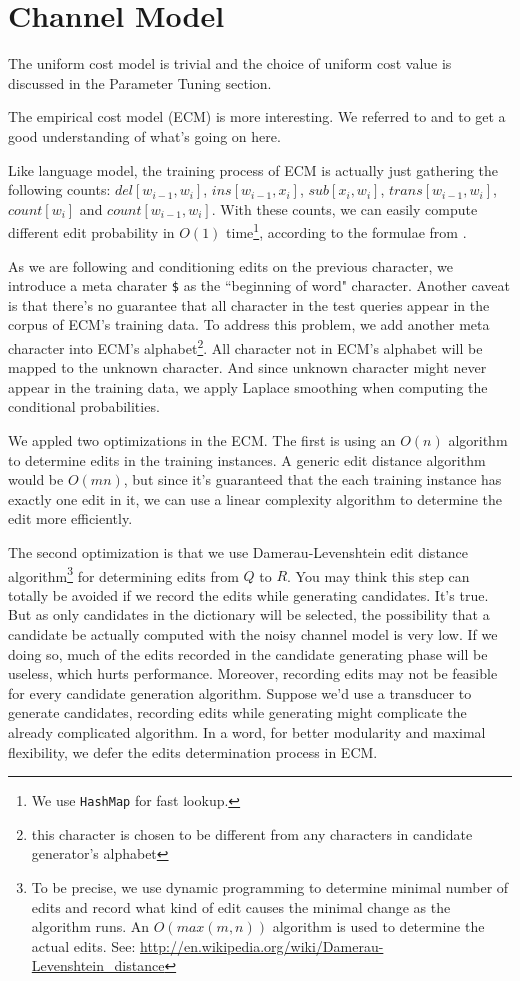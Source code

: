\documentclass{article}
\begin{document}
\section{Channel Model}

The uniform cost model is trivial and the choice of uniform cost value is discussed in the Parameter Tuning section.

The empirical cost model (ECM) is more interesting. We referred to \cite{jm-book} and \cite{kernighan-1990} to get a good understanding of what's going on here.

Like language model, the training process of ECM is actually just gathering the following counts: $del[w_{i-1},w_i]$, $ins[w_{i-1},x_i]$, $sub[x_i,w_i]$, $trans[w_{i-1},w_i]$, $count[w_i]$ and $count[w_{i-1},w_i]$. With these counts, we can easily compute different edit probability in $O(1)$ time\footnote{We use \texttt{HashMap} for fast lookup.}, according to the formulae from \cite{kernighan-1990}.

As we are following \cite{kernighan-1990} and conditioning edits on the previous character, we introduce a meta charater \texttt{\$} as the ``beginning of word" character. Another caveat is that there's no guarantee that all character in the test queries appear in the corpus of ECM's training data. To address this problem, we add another meta character into ECM's alphabet\footnote{this character is chosen to be different from any characters in candidate generator's alphabet}. All character not in ECM's alphabet will be mapped to the unknown character. And since unknown character might never appear in the training data, we apply Laplace smoothing when computing the conditional probabilities.

We appled two optimizations in the ECM. The first is using an $O(n)$ algorithm to determine edits in the training instances. A generic edit distance algorithm would be $O(mn)$, but since it's guaranteed that the each training instance has exactly one edit in it, we can use a linear complexity algorithm to determine the edit more efficiently.

The second optimization is that we use Damerau-Levenshtein edit distance algorithm\footnote{To be precise, we use dynamic programming to determine minimal number of edits and record what kind of edit causes the minimal change as the algorithm runs. An $O(max(m,n))$ algorithm is used to determine the actual edits. See: \url{http://en.wikipedia.org/wiki/Damerau-Levenshtein\_distance}} for determining edits from $Q$ to $R$. You may think this step can totally be avoided if we record the edits while generating candidates. It's true. But as only candidates in the dictionary will be selected, the possibility that a candidate be actually computed with the noisy channel model is very low. If we doing so, much of the edits recorded in the candidate generating phase will be useless, which hurts performance. Moreover, recording edits may not be feasible for every candidate generation algorithm. Suppose we'd use a transducer to generate candidates, recording edits while generating might complicate the already complicated algorithm. In a word, for better modularity and maximal flexibility, we defer the edits determination process in ECM.
\end{document}
